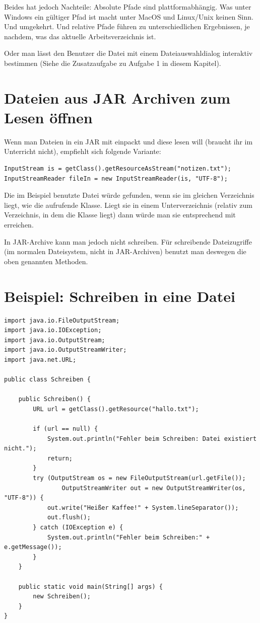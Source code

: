 Beides hat jedoch Nachteile: Absolute Pfade sind plattformabhängig. Was unter
Windows ein gültiger Pfad ist macht unter MacOS und Linux/Unix keinen Sinn. Und
umgekehrt. Und relative Pfade führen zu unterschiedlichen Ergebnissen, je
nachdem, was das aktuelle Arbeitsverzeichnis ist.

Oder man lässt den Benutzer die Datei mit einem Dateiauswahldialog interaktiv
bestimmen (Siehe die Zusatzaufgabe zu Aufgabe 1 in diesem Kapitel).


\section{Dateien aus JAR Archiven zum Lesen öffnen}

Wenn man Dateien in ein JAR mit einpackt und diese lesen will (braucht ihr im
Unterricht nicht), empfiehlt sich folgende Variante:

\begin{lstlisting}
InputStream is = getClass().getResourceAsStream("notizen.txt");
InputStreamReader fileIn = new InputStreamReader(is, "UTF-8");
\end{lstlisting}

Die im Beispiel benutzte Datei  würde gefunden, wenn sie im
gleichen Verzeichnis liegt, wie die aufrufende Klasse. Liegt sie in einem
Unterverzeichnis (relativ zum Verzeichnis, in dem die Klasse liegt) dann würde
man sie entsprechend mit  erreichen.

In JAR-Archive kann man jedoch nicht schreiben. Für schreibende Dateizugriffe
(im normalen Dateisystem, nicht in JAR-Archiven) benutzt man deswegen die oben
genannten Methoden.


\section{Beispiel: Schreiben in eine Datei}

\begin{lstlisting}
import java.io.FileOutputStream;
import java.io.IOException;
import java.io.OutputStream;
import java.io.OutputStreamWriter;
import java.net.URL;

public class Schreiben {
	
    public Schreiben() {
        URL url = getClass().getResource("hallo.txt");

        if (url == null) {
            System.out.println("Fehler beim Schreiben: Datei existiert nicht.");
            return;
        }
        try (OutputStream os = new FileOutputStream(url.getFile());
                OutputStreamWriter out = new OutputStreamWriter(os, "UTF-8")) {
            out.write("Heißer Kaffee!" + System.lineSeparator());
            out.flush();
        } catch (IOException e) {
            System.out.println("Fehler beim Schreiben:" + e.getMessage());
        }
    }

    public static void main(String[] args) {
        new Schreiben();
    }
}
\end{lstlisting}



